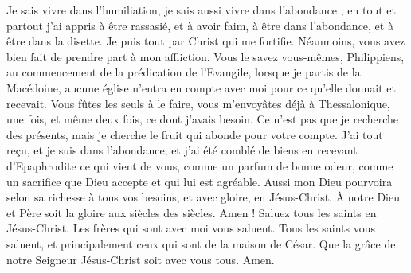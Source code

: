 \begin{multicols}{2}
Je sais vivre dans l’humiliation, je sais aussi vivre dans l'abondance ; en tout et partout j’ai appris à être rassasié, et à avoir faim, à être dans l'abondance, et à être dans la disette.
Je puis tout par Christ qui me fortifie.
Néanmoins, vous avez bien fait de prendre part à mon affliction.
Vous le savez vous-mêmes, Philippiens, au commencement de la prédication de l’Evangile, lorsque je partis de la Macédoine, aucune église n’entra en compte avec moi pour ce qu’elle donnait et recevait.
Vous fûtes les seuls à le faire, vous m’envoyâtes déjà à Thessalonique, une fois, et même deux fois, ce dont j'avais besoin.
Ce n'est pas que je recherche des présents, mais je cherche le fruit qui abonde pour votre compte.
J'ai tout reçu, et je suis dans l'abondance, et j'ai été comblé de biens en recevant d'Epaphrodite ce qui vient de vous, comme un parfum de bonne odeur, comme un sacrifice que Dieu accepte et qui lui est agréable.
Aussi mon Dieu pourvoira selon sa richesse à tous vos besoins, et avec gloire, en Jésus-Christ.
\TextTitle{[Conclusion]}
À notre Dieu et Père soit la gloire aux siècles des siècles. Amen !
Saluez tous les saints en Jésus-Christ. Les frères qui sont avec moi vous saluent.
Tous les saints vous saluent, et principalement ceux qui sont de la maison de César.
Que la grâce de notre Seigneur Jésus-Christ soit avec vous tous. Amen.
\PPE{}
\end{multicols}
